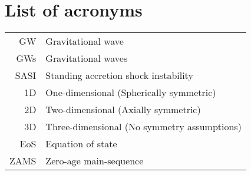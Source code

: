 \chapter{List of acronyms}
\begin{longtable}{r p{5in} }
{GW}   & Gravitational wave \\
{GWs} & Gravitational waves \\
{SASI} & Standing accretion shock instability \\
{1D} & One-dimensional (Spherically symmetric) \\
{2D} & Two-dimensional (Axially symmetric) \\
{3D} & Three-dimensional (No symmetry assumptions) \\
{EoS}  & Equation of state \\
{ZAMS} & Zero-age main-sequence
\end{longtable}